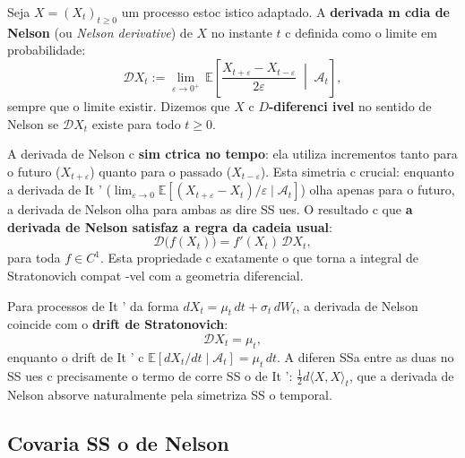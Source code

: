 {\begin{defi}\label{def:nelson_derivative}
Seja $X = (X_t)_{t \geq 0}$ um processo estoc istico adaptado. A
\textbf{derivada m cdia de Nelson} (ou \textit{Nelson derivative}) de
$X$ no instante $t$ c definida como o limite em probabilidade:
\begin{equation}\label{eq:nelson_def}
 \mathcal{D}X_t := \lim_{\varepsilon \to 0^+}\,
 \mathbb{E}\!\left[
 \frac{X_{t+\varepsilon} - X_{t-\varepsilon}}{2\varepsilon}
 \;\middle|\;
 \mathcal{A}_t
 \right],
\end{equation}
sempre que o limite existir. Dizemos que $X$ c \textbf{$D$-diferenci ivel}
no sentido de Nelson se $\mathcal{D}X_t$ existe para todo $t \geq 0$.
\end{defi}

\begin{obs}
A derivada de Nelson c \textbf{sim ctrica no tempo}: ela utiliza
incrementos tanto para o futuro ($X_{t+\varepsilon}$) quanto para o
passado ($X_{t-\varepsilon}$). Esta simetria c crucial: enquanto a
derivada de It ' ($\lim_{\varepsilon \to 0} \mathbb{E}[(X_{t+\varepsilon}
- X_t)/\varepsilon \mid \mathcal{A}_t]$) olha apenas para o futuro, a
derivada de Nelson olha para ambas as dire SS ues. O resultado c que
\textbf{a derivada de Nelson satisfaz a regra da cadeia usual}:
\begin{equation}\label{eq:nelson_chain}
 \mathcal{D}\big(f(X_t)\big) = f'(X_t)\,\mathcal{D}X_t,
\end{equation}
para toda $f \in C^1$. Esta propriedade c exatamente o que torna a
integral de Stratonovich compat -vel com a geometria diferencial.
\end{obs}

\begin{obs}
Para processos de It ' da forma $dX_t = \mu_t\,dt + \sigma_t\,dW_t$,
a derivada de Nelson coincide com o \textbf{drift de Stratonovich}:
\begin{equation}\label{eq:nelson_stratonovich}
 \mathcal{D}X_t = \mu_t,
\end{equation}
enquanto o drift de It ' c $\mathbb{E}[dX_t/dt \mid \mathcal{A}_t] =
\mu_t\,dt$. A diferen SSa entre as duas no SS ues c precisamente o termo de
corre SS o de It ': $\frac{1}{2}d\langle X, X\rangle_t$, que a derivada de
Nelson absorve naturalmente pela simetriza SS o temporal.
\end{obs}

\subsection{Covaria SS o de Nelson}

}
